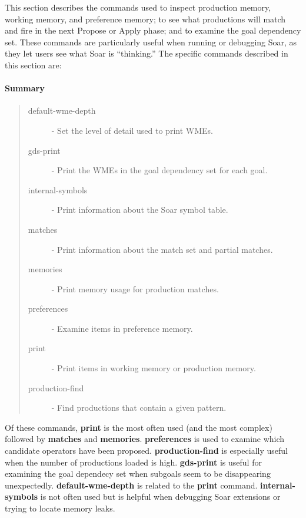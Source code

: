 This section describes the commands used to inspect production memory,
working memory, and preference memory; to see what productions will 
match and fire in the next Propose or Apply phase;  and to examine the 
goal dependency set.  These commands are particularly useful when
running or debugging Soar, as they let users see what Soar is ``thinking.''
The specific commands described in this section are:

\paragraph{Summary}
\begin{quote}
\begin{description}
\item[default-wme-depth] - Set the level of detail used to print WMEs.
\item[gds-print] - Print the WMEs in the goal dependency set for each goal.
\item[internal-symbols] - Print information about the Soar symbol table.
\item[matches] - Print information about the match set and partial matches.
\item[memories] - Print memory usage for production matches.
\item[preferences] - Examine items in preference memory.
\item[print] - Print items in working memory or production memory.
\item[production-find] - Find productions that contain a given pattern.
\end{description}
\end{quote}

Of these commands, \textbf{print} is the most often used (and the most
complex) followed by \textbf{matches} and \textbf{memories}.  \textbf{preferences}
is used to examine which candidate operators have been proposed.
\textbf{production-find} is especially useful when the number of
productions loaded is high.  \textbf{gds-print}
is useful for examining the goal dependecy set when subgoals seem to
be disappearing unexpectedly.  \textbf{default-wme-depth} is related to the \textbf{print} command.
\textbf{internal-symbols} is not often used but is helpful when debugging Soar extensions or
trying to locate memory leaks.










